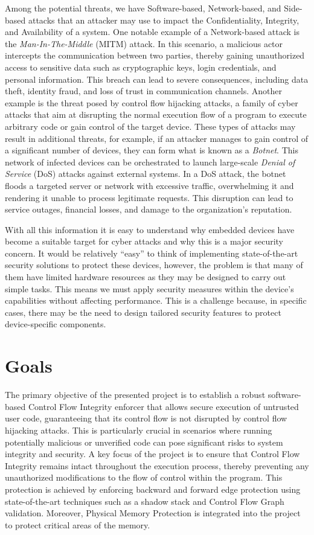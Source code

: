 Among the potential threats, we have Software-based, Network-based, and Side-based
attacks that an attacker may use to impact the Confidentiality, Integrity, and
Availability of a system. One notable example of a Network-based attack is the \textit{Man-In-The-Middle}
(MITM) attack. In this scenario, a malicious actor intercepts the communication
between two parties, thereby gaining unauthorized access to sensitive data such as
cryptographic keys, login credentials, and personal information. This breach can
lead to severe consequences, including data theft, identity fraud, and loss of trust
in communication channels. Another example is the threat posed by control flow
hijacking attacks, a family of cyber attacks that aim at disrupting the normal execution
flow of a program to execute arbitrary code or gain control of the target device.
These types of attacks may result in additional threats, for example, if an
attacker manages to gain control of a significant number of devices, they can form
what is known as a \textit{Botnet}. This network of infected devices can be orchestrated
to launch large-scale \textit{Denial of Service} (DoS) attacks against external
systems. In a DoS attack, the botnet floods a targeted server or network with
excessive traffic, overwhelming it and rendering it unable to process legitimate
requests. This disruption can lead to service outages, financial losses, and
damage to the organization's reputation.

With all this information it is easy to understand why embedded devices have
become a suitable target for cyber attacks and why this is a major security
concern. It would be relatively ``easy'' to think of implementing state-of-the-art
security solutions to protect these devices, however, the problem is that many of
them have limited hardware resources as they may be designed to carry out simple
tasks. This means we must apply security measures within the device's
capabilities without affecting performance. This is a challenge because, in
specific cases, there may be the need to design tailored security features to protect
device-specific components.

\section{Goals}
\label{sec:intro_goals}

The primary objective of the presented project is to establish a robust software-based
Control Flow Integrity enforcer that allows secure execution of untrusted user
code, guaranteeing that its control flow is not disrupted by control flow hijacking
attacks. This is particularly crucial in scenarios where running potentially
malicious or unverified code can pose significant risks to system integrity and
security. A key focus of the project is to ensure that Control Flow Integrity remains
intact throughout the execution process, thereby preventing any unauthorized
modifications to the flow of control within the program. This protection is achieved
by enforcing backward and forward edge protection using state-of-the-art techniques
such as a shadow stack and Control Flow Graph validation. Moreover, Physical Memory
Protection is integrated into the project to protect critical areas of the memory.

